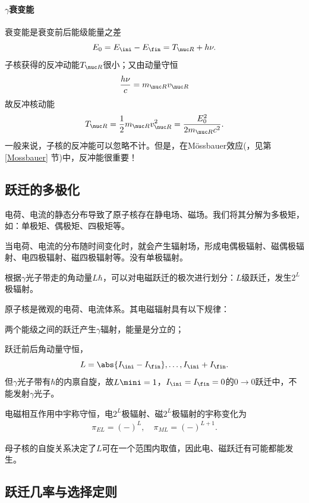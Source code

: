 \paragraph{$\gamma$衰变能}
衰变能是衰变前后能级能量之差
\[
	E_0=E_\ini-E_\fin=T_{\nuc R}+h\nu.
\]
子核获得的反冲动能$T_{\nuc R}$很小；又由动量守恒
\[
	\frac{h\nu}c=m_{\nuc R}v_{\nuc R}
\]
故反冲核动能
\begin{align}
	T_{\nuc R}=\frac12m_{\nuc R}v_{\nuc R}^2=\frac{E_0^2}{2m_{\nuc R}c^2}.
\end{align}
一般来说，子核的反冲能可以忽略不计。但是，在Mössbauer效应(，见第 \ref{Mossbauer} 节)中，反冲能很重要！

\subsection{\textgamma 跃迁的多极化}

电荷、电流的静态分布导致了原子核存在静电场、磁场。我们将其分解为多极矩，如：单极矩、偶极矩、四极矩等。

当电荷、电流的分布随时间变化时，就会产生辐射场，形成电偶极辐射、磁偶极辐射、电四极辐射、磁四极辐射等。没有单极辐射。

根据$\gamma$光子带走的角动量$L\hbar$，可以对电磁跃迁的极次进行划分：$L$级跃迁，发生$2^L$极辐射。

原子核是微观的电荷、电流体系。其电磁辐射具有以下规律：
\begin{compactenum}
	\item 两个能级之间的跃迁产生$\gamma$辐射，能量是分立的；
	\item 跃迁前后角动量守恒，
	\[
		L=\abs{I_\ini-I_\fin},\ldots,I_\ini+I_\fin.
	\]
	但$\gamma$光子带有$\hbar$的内禀自旋，故$L\mini=1$，$I_\ini=I_\fin=0$的$0\to0$跃迁中，不能发射$\gamma$光子。
	\item 电磁相互作用中宇称守恒，电$2^L$极辐射、磁$2^L$极辐射的宇称变化为
	\begin{align}
		\pi_{EL}=(-)^L,\quad\pi_{ML}=(-)^{L+1}.
	\end{align}
\end{compactenum}
母子核的自旋关系决定了$L$可在一个范围内取值，因此电、磁跃迁有可能都能发生。

\subsection{\textgamma 跃迁几率与选择定则}

